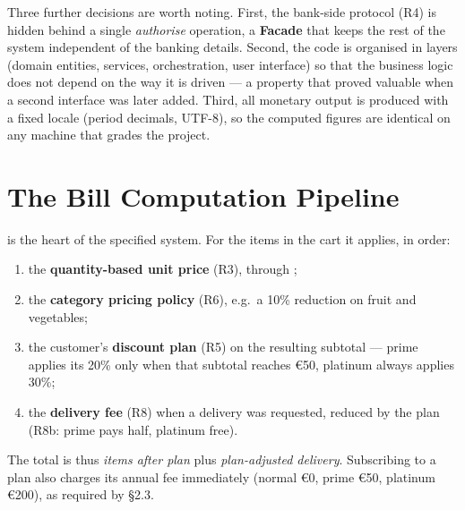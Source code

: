 Three further decisions are worth noting. First, the bank-side protocol (R4) is
hidden behind a single \emph{authorise} operation, a \textbf{Facade} that keeps
the rest of the system independent of the banking details. Second, the code is
organised in layers (domain entities, services, orchestration, user interface)
so that the business logic does not depend on the way it is driven --- a property
that proved valuable when a second interface was later added. Third, all
monetary output is produced with a fixed locale (period decimals, UTF-8), so the
computed figures are identical on any machine that grades the project.

\section{The Bill Computation Pipeline}
 is the heart of the specified system. For the
items in the cart it applies, in order:
\begin{enumerate}[nosep]
  \item the \textbf{quantity-based unit price} (R3), through
  ;
  \item the \textbf{category pricing policy} (R6), e.g.\ a 10\% reduction on
  fruit and vegetables;
  \item the customer's \textbf{discount plan} (R5) on the resulting subtotal ---
  prime applies its 20\% only when that subtotal reaches \euro{}50, platinum
  always applies 30\%;
  \item the \textbf{delivery fee} (R8) when a delivery was requested, reduced by
  the plan (R8b: prime pays half, platinum free).
\end{enumerate}
The total is thus \emph{items after plan} plus \emph{plan-adjusted delivery}.
Subscribing to a plan also charges its annual fee immediately (normal
\euro{}0, prime \euro{}50, platinum \euro{}200), as required by \S2.3.
